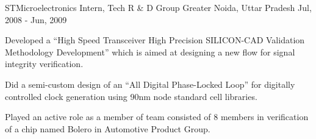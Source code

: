 \begin{cventries}
  \cventry
    {STMicroelectronics} %
    {Intern, Tech R \& D Group} %
    {Greater Noida, Uttar Pradesh} %
    {Jul, 2008 - Jun, 2009} %
    {
      \begin{cvitems} %
        \item {Developed a “High Speed Transceiver High Precision SILICON-CAD Validation Methodology Development” which is aimed at designing a new flow for signal integrity verification.}
        \item {Did a semi-custom design of an “All Digital Phase-Locked Loop” for digitally controlled clock generation using 90nm node standard cell libraries.}
        \item {Played an active role as a member of team consisted of 8 members in verification of a chip named Bolero in Automotive Product Group.}
      \end{cvitems}
    }

\end{cventries}
